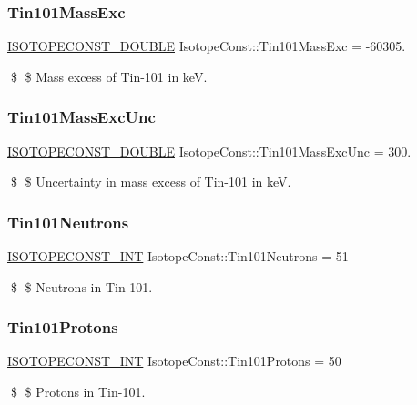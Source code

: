 \subsubsection{\texorpdfstring{Tin101\+Mass\+Exc}{Tin101MassExc}}
{\footnotesize\ttfamily \mbox{\hyperlink{group___isotope_const-_macros_ga8f45a7272ce02c0b4c65c44636ed719a}{I\+S\+O\+T\+O\+P\+E\+C\+O\+N\+S\+T\+\_\+\+D\+O\+U\+B\+LE}} Isotope\+Const\+::\+Tin101\+Mass\+Exc = -\/60305.}

\$ \$ Mass excess of Tin-\/101 in keV. \mbox{\label{group___isotope_const-_tin-_sn101_gaa7d5e73cd08b7b59d4bc4a2613b45f6f}} 
\subsubsection{\texorpdfstring{Tin101\+Mass\+Exc\+Unc}{Tin101MassExcUnc}}
{\footnotesize\ttfamily \mbox{\hyperlink{group___isotope_const-_macros_ga8f45a7272ce02c0b4c65c44636ed719a}{I\+S\+O\+T\+O\+P\+E\+C\+O\+N\+S\+T\+\_\+\+D\+O\+U\+B\+LE}} Isotope\+Const\+::\+Tin101\+Mass\+Exc\+Unc = 300.}

\$ \$ Uncertainty in mass excess of Tin-\/101 in keV. \mbox{\label{group___isotope_const-_tin-_sn101_ga6bfe92a8bb418ecd28b31b00813a3460}} 
\subsubsection{\texorpdfstring{Tin101\+Neutrons}{Tin101Neutrons}}
{\footnotesize\ttfamily \mbox{\hyperlink{group___isotope_const-_macros_ga5f18360b3e99483a35c32d789e62621c}{I\+S\+O\+T\+O\+P\+E\+C\+O\+N\+S\+T\+\_\+\+I\+NT}} Isotope\+Const\+::\+Tin101\+Neutrons = 51}

\$ \$ Neutrons in Tin-\/101. \mbox{\label{group___isotope_const-_tin-_sn101_ga186bba57ed2f3a39e8db40d48635bbf0}} 
\subsubsection{\texorpdfstring{Tin101\+Protons}{Tin101Protons}}
{\footnotesize\ttfamily \mbox{\hyperlink{group___isotope_const-_macros_ga5f18360b3e99483a35c32d789e62621c}{I\+S\+O\+T\+O\+P\+E\+C\+O\+N\+S\+T\+\_\+\+I\+NT}} Isotope\+Const\+::\+Tin101\+Protons = 50}

\$ \$ Protons in Tin-\/101. 